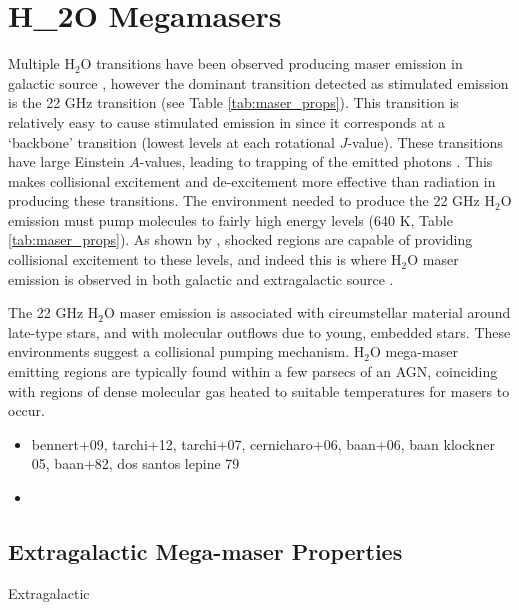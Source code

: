 \section{H_2O Megamasers}
\label{sec:h2o_mm}

Multiple H$_2$O transitions have been observed producing maser emission in galactic source \citep{Elitzur_1992}, however the dominant transition detected as stimulated emission is the 22 GHz transition (see Table \ref{tab:maser_props}). This transition is relatively easy to cause stimulated emission in since it corresponds at a `backbone' transition (lowest levels at each rotational $J$-value). These transitions have large Einstein $A$-values, leading to trapping of the emitted photons \citep{stahler_palla_2004}. This makes collisional excitement and de-excitement more effective than radiation in producing these transitions. The environment needed to produce the 22 GHz H$_2$O emission must pump molecules to fairly high energy levels (640 K, Table \ref{tab:maser_props}). As shown by \citet{stahler_palla_2004}, shocked regions are capable of providing collisional excitement to these levels, and indeed this is where H$_2$O maser emission is observed in both galactic and extragalactic source \citep{Elitzur_1992, lo2005}. 

The 22 GHz H$_2$O maser emission is associated with circumstellar material around late-type stars, and with molecular outflows due to young, embedded stars. These environments suggest a collisional pumping mechanism. H$_2$O mega-maser emitting regions are typically found within a few parsecs of an AGN, coinciding with regions of dense molecular gas heated to suitable temperatures for masers to occur. 

\begin{itemize}
\item bennert+09, tarchi+12, tarchi+07, cernicharo+06, baan+06, baan klockner 05, baan+82, dos santos lepine 79
\item 
\end{itemize}

\subsection{Extragalactic Mega-maser Properties}
\label{sub:h2o_props}

Extragalactic

